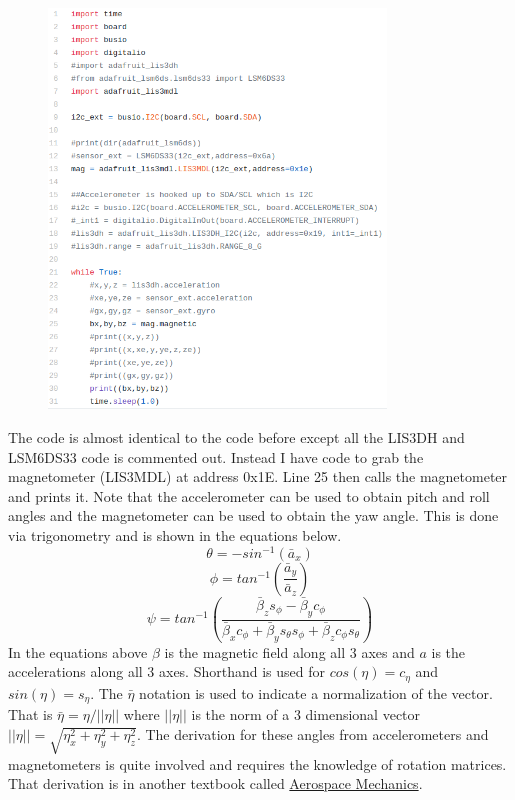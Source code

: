 \begin{figure}[H]
  \begin{center}
    \includegraphics[width=0.8\textwidth]{Figures/imu_code_mag.png}
  \end{center}
\end{figure}
The code is almost identical to the code before except all the LIS3DH and LSM6DS33 code is commented out. Instead I have code to grab the magnetometer (LIS3MDL) at address 0x1E. Line 25 then calls the magnetometer and prints it. Note that the accelerometer can be used to obtain pitch and roll angles and the magnetometer can be used to obtain the yaw angle. This is done via trigonometry and is shown in the equations below. 
\begin{equation}
\theta = -sin^{-1}(\bar{a}_x)
\end{equation}
\begin{equation}
\phi = tan^{-1}\left(\frac{\bar{a}_y}{\bar{a}_z}\right)
\end{equation}
\begin{equation}
\psi = tan^{-1}\left(\frac{\bar{\beta}_z s_{\phi} - \bar{\beta}_y c_{\phi}}{\bar{\beta}_x c_{\phi} + \bar{\beta}_y s_{\theta}s_{\phi} + \bar{\beta}_z c_{\phi}s_{\theta}}\right)
\end{equation}
In the equations above $\beta$ is the magnetic field along all 3 axes and $a$ is the accelerations along all 3 axes. Shorthand is used for $cos(\eta)=c_{\eta}$ and $sin(\eta)=s_{\eta}$. The $\bar{\eta}$ notation is used to indicate a normalization of the vector. That is $\bar{\eta} = \eta/||\eta||$ where $||\eta||$ is the norm of a 3 dimensional vector $||\eta||=\sqrt{\eta_x^2+\eta_y^2+\eta_z^2}$. The derivation for these angles from accelerometers and magnetometers is quite involved and requires the knowledge of rotation matrices. That derivation is in another textbook called \href{https://github.com/cmontalvo251/LaTeX/tree/master/Aerospace_Mechanics}{Aerospace Mechanics}.

